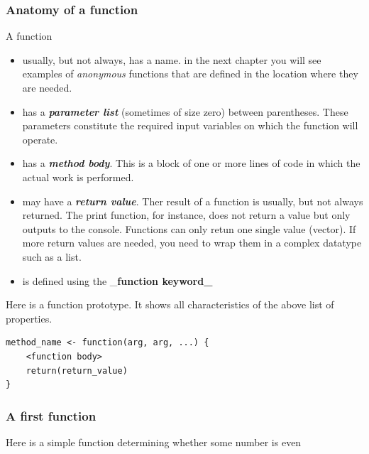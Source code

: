 \documentclass[]{book}
\providecommand{\tightlist}{%
  \setlength{\itemsep}{0pt}\setlength{\parskip}{0pt}}
\begin{document}
\hypertarget{anatomy-of-a-function}{%
\subsubsection*{Anatomy of a function}\label{anatomy-of-a-function}}

A function

\begin{itemize}
\tightlist
\item
  usually, but not always, has a name. in the next chapter you will see examples of \emph{anonymous} functions that are defined in the location where they are needed.\\
\item
  has a \textbf{\emph{parameter list}} (sometimes of size zero) between parentheses. These parameters constitute the required input variables on which the function will operate.\\
\item
  has a \textbf{\emph{method body}}. This is a block of one or more lines of code in which the actual work is performed.\\
\item
  may have a \textbf{\emph{return value}}. Ther result of a function is usually, but not always returned. The print function, for instance, does not return a value but only outputs to the console. Functions can only retun one single value (vector). If more return values are needed, you need to wrap them in a complex datatype such as a list.\\
\item
  is defined using the \_\textbf{function keyword\_}
\end{itemize}

Here is a function prototype. It shows all characteristics of the above list of properties.

\begin{verbatim}
method_name <- function(arg, arg, ...) {
    <function body>
    return(return_value)
}
\end{verbatim}

\hypertarget{a-first-function}{%
\subsubsection*{A first function}\label{a-first-function}}

Here is a simple function determining whether some number is even
\end{document}
